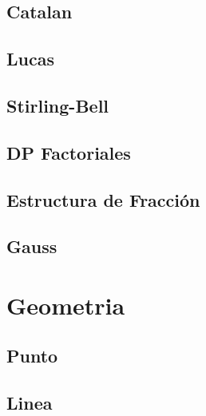 \documentclass[a4paper,11pt,landscape,twocolumn]{article}
\begin{document}




\subsection{Catalan}



\subsection{Lucas}



\subsection{Stirling-Bell}



\subsection{DP Factoriales}



\subsection{Estructura de Fracción}



\subsection{Gauss}



\section{Geometria}

\subsection{Punto}



\subsection{Linea}
\end{document}
